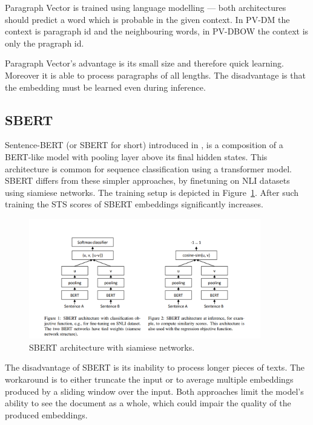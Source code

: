 Paragraph Vector is trained using language modelling --- both architectures should
predict a word which is probable in the given context. In PV-DM the context is
paragraph id and the neighbouring words, in PV-DBOW the context is only the
pragraph id.

Paragraph Vector's advantage is its small size and therefore quick learning.
Moreover it is able to process paragraphs of all lengths. The disadvantage is
that the embedding must be learned even during inference.

\subsection{SBERT}

Sentence-BERT (or SBERT for short) introduced in \cite{reimers2019sentence}, is
a composition of a BERT-like model with pooling layer above its final hidden
states. This architecture is common for sequence classification using a
transformer model. SBERT differs from these simpler approaches, by finetuning on
NLI datasets using siamiese networks. The training setup is depicted in
Figure~\ref{fig:sbert_siemese}. After such training the STS scores of SBERT
embeddings significantly increases.

\begin{figure}
    \centering
    \includegraphics[width=0.9\textwidth]{./img/sbert_pairs_architectures.png}
    \caption{SBERT architecture with siamiese
    networks.\label{fig:sbert_siemese}}
\end{figure}

The disadvantage of SBERT is its inability to process longer pieces of texts.
The workaround is to either truncate the input or to average multiple embeddings
produced by a sliding window over the input. Both approaches limit the model's
ability to see the document as a whole, which could impair the quality of the
produced embeddings.

